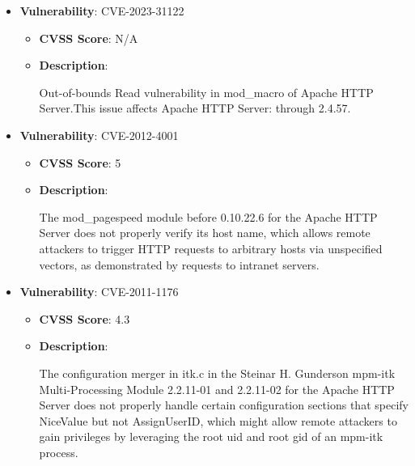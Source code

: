 \documentclass{article}
\begin{document}
\begin{itemize}
        \item \textbf{Vulnerability}: CVE-2023-31122
        \begin{itemize}
            \item \textbf{CVSS Score}:  N/A 
            \item \textbf{Description}:
            \parbox[t]{0.9\linewidth}{
                \ttfamily Out-of-bounds Read vulnerability in mod\_macro of Apache HTTP Server.This issue affects Apache HTTP Server: through 2.4.57.
            }
        \end{itemize}
    
        \item \textbf{Vulnerability}: CVE-2012-4001
        \begin{itemize}
            \item \textbf{CVSS Score}:  5 
            \item \textbf{Description}:
            \parbox[t]{0.9\linewidth}{
                \ttfamily The mod\_pagespeed module before 0.10.22.6 for the Apache HTTP Server does not properly verify its host name, which allows remote attackers to trigger HTTP requests to arbitrary hosts via unspecified vectors, as demonstrated by requests to intranet servers.
            }
        \end{itemize}
    
        \item \textbf{Vulnerability}: CVE-2011-1176
        \begin{itemize}
            \item \textbf{CVSS Score}:  4.3 
            \item \textbf{Description}:
            \parbox[t]{0.9\linewidth}{
                \ttfamily The configuration merger in itk.c in the Steinar H. Gunderson mpm-itk Multi-Processing Module 2.2.11-01 and 2.2.11-02 for the Apache HTTP Server does not properly handle certain configuration sections that specify NiceValue but not AssignUserID, which might allow remote attackers to gain privileges by leveraging the root uid and root gid of an mpm-itk process.
            }
        \end{itemize}
    

\end{itemize}
\end{document}
